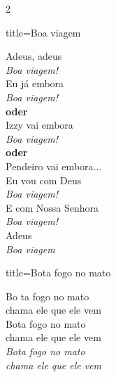 \documentclass[fontsize=14pt, paper=a4, twoside, DIV=20]{scrreprt} %
\begin{document}
\begin{multicols*}{2}
 \columnbreak

 \begin{song}{title={Boa viagem}}
     \begin{verse*}
     Adeus, adeus\\
     \textit{Boa viagem!}\\
     Eu já embora \\
     \textit{Boa viagem!}\\
     \textbf{oder}\\
     Izzy vai embora\\
     \textit{Boa viagem!}\\
     \textbf{oder}\\
     Pendeiro vai embora...\\
     Eu vou com Deus\\
     \textit{Boa viagem!}\\
     E com Nossa Senhora \\
     \textit{Boa viagem!}\\
     Adeus \\
     \textit{Boa viagem\!}\\
     \end{verse*}
 \end{song}


 \begin{song}{title={Bota fogo no mato}}
         \begin{verse*}
             Bo ta fogo no mato\\
             chama ele que ele vem\\
             Bota fogo no mato\\
             chama ele que ele vem\\
             \textit{Bota fogo no mato}\\
             \textit{chama ele que ele vem}\\
         \end{verse*}
 \end{song}


\end{multicols*}
\end{document}
